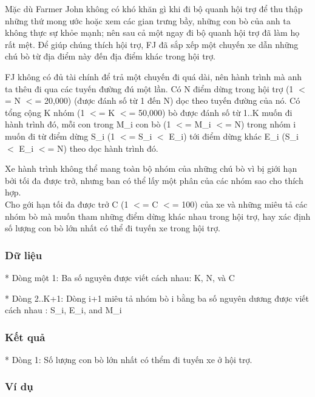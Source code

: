 



   Mặc dù Farmer John không có khó khăn gì khi đi bộ quanh hội trợ để thu thập những thứ mong ước hoặc xem các gian trưng bầy, những con bò của anh ta không thực sự khỏe mạnh; nên sau cả một ngay đi bộ quanh hội trợ đã làm họ rất mệt. Để giúp chúng thích hội trợ, FJ đã sắp xếp một chuyến xe dẫn những chú bò từ địa điểm này đến địa điểm khác trong hội trợ.  

   FJ không có đủ tài chính để trả một chuyến đi quá dài, nên hành trình mà  anh ta thêu đi qua các tuyến đường đú một lần. Có N điểm dừng trong hội  trợ (1 $<$= N $<$= 20,000) (được đánh số từ 1 đến N) dọc theo tuyến đường của  nó. Có tổng cộng K nhóm (1 $<$= K $<$= 50,000) bò được đánh số từ 1..K muốn đi hành trình đó, mỗi con trong M\_i con bò (1 $<$= M\_i $<$= N) trong nhóm i  muốn đi từ điểm dừng S\_i (1 $<$= S\_i $<$ E\_i) tới điểm dừng khác E\_i  (S\_i $<$ E\_i $<$= N) theo dọc hành trình đó.  

   Xe hành trình không thể mang toàn bộ nhóm của những chú bò vì bị giới hạn  bởi tối đa được trở, nhưng ban có thể lấy một phân của các nhóm sao cho thích hợp.   
\\

   Cho gới hạn tối đa được trở C (1 $<$= C $<$= 100) của xe và những miêu tả các  nhóm bò mà muốn tham những điểm dừng khác nhau trong hội trợ, hay xác định  số lượng con bò lớn nhất có thể đi tuyến xe trong hội trợ.  

\subsubsection{   Dữ liệu  }

   * Dòng một 1: Ba số nguyên được viết cách nhau: K, N, và C  

   * Dòng 2..K+1: Dòng i+1 miêu tả nhóm bò i bằng ba số nguyên dương được viết cách nhau : S\_i, E\_i, and M\_i  

\subsubsection{   Kết quả  }

   * Dòng 1: Số lượng con bò lớn nhất có thểm đi tuyến xe ở hội trợ.  

\subsubsection{   Ví dụ  }

